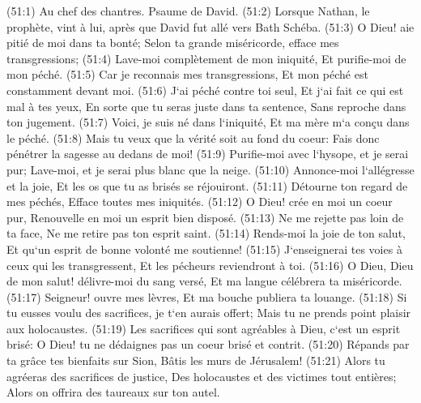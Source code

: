 \verse (51:1) Au chef des chantres. Psaume de David. (51:2) Lorsque Nathan, le prophète, vint à lui, après que David fut allé vers Bath Schéba. (51:3) O Dieu! aie pitié de moi dans ta bonté; Selon ta grande miséricorde, efface mes transgressions; 
\verse (51:4) Lave-moi complètement de mon iniquité, Et purifie-moi de mon péché. 
\verse (51:5) Car je reconnais mes transgressions, Et mon péché est constamment devant moi. 
\verse (51:6) J`ai péché contre toi seul, Et j`ai fait ce qui est mal à tes yeux, En sorte que tu seras juste dans ta sentence, Sans reproche dans ton jugement. 
\verse (51:7) Voici, je suis né dans l`iniquité, Et ma mère m`a conçu dans le péché. 
\verse (51:8) Mais tu veux que la vérité soit au fond du coeur: Fais donc pénétrer la sagesse au dedans de moi! 
\verse (51:9) Purifie-moi avec l`hysope, et je serai pur; Lave-moi, et je serai plus blanc que la neige. 
\verse (51:10) Annonce-moi l`allégresse et la joie, Et les os que tu as brisés se réjouiront. 
\verse (51:11) Détourne ton regard de mes péchés, Efface toutes mes iniquités. 
\verse (51:12) O Dieu! crée en moi un coeur pur, Renouvelle en moi un esprit bien disposé. 
\verse (51:13) Ne me rejette pas loin de ta face, Ne me retire pas ton esprit saint. 
\verse (51:14) Rends-moi la joie de ton salut, Et qu`un esprit de bonne volonté me soutienne! 
\verse (51:15) J`enseignerai tes voies à ceux qui les transgressent, Et les pécheurs reviendront à toi. 
\verse (51:16) O Dieu, Dieu de mon salut! délivre-moi du sang versé, Et ma langue célébrera ta miséricorde. 
\verse (51:17) Seigneur! ouvre mes lèvres, Et ma bouche publiera ta louange. 
\verse (51:18) Si tu eusses voulu des sacrifices, je t`en aurais offert; Mais tu ne prends point plaisir aux holocaustes. 
\verse (51:19) Les sacrifices qui sont agréables à Dieu, c`est un esprit brisé: O Dieu! tu ne dédaignes pas un coeur brisé et contrit. 
\verse (51:20) Répands par ta grâce tes bienfaits sur Sion, Bâtis les murs de Jérusalem! 
\verse (51:21) Alors tu agréeras des sacrifices de justice, Des holocaustes et des victimes tout entières; Alors on offrira des taureaux sur ton autel. 

\chapter{}

